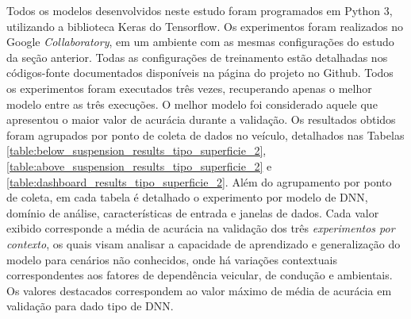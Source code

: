 Todos os modelos desenvolvidos neste estudo foram programados em Python 3, utilizando a biblioteca Keras do Tensorflow. Os experimentos foram realizados no Google \textit{Collaboratory}, em um ambiente com as mesmas configurações do estudo da seção anterior. Todas as configurações de treinamento estão detalhadas nos códigos-fonte documentados disponíveis na página do projeto no Github. Todos os experimentos foram executados três vezes, %
recuperando apenas o melhor modelo entre as três execuções. O melhor modelo foi considerado aquele que apresentou o maior valor de acurácia durante a validação. Os resultados obtidos foram agrupados por ponto de coleta de dados no veículo, detalhados nas Tabelas \ref{table:below_suspension_results_tipo_superficie_2}, \ref{table:above_suspension_results_tipo_superficie_2} e \ref{table:dashboard_results_tipo_superficie_2}. Além do agrupamento por ponto de coleta, em cada tabela é detalhado o experimento por modelo de DNN, domínio de análise, características de entrada e janelas de dados. Cada valor exibido corresponde a média de acurácia na validação dos três \emph{experimentos por contexto}, os quais visam analisar a capacidade de aprendizado e generalização do modelo para cenários não conhecidos, onde há variações contextuais correspondentes aos fatores de dependência veicular, de condução e ambientais. Os valores destacados correspondem ao valor máximo de média de acurácia em validação para dado tipo de DNN.


